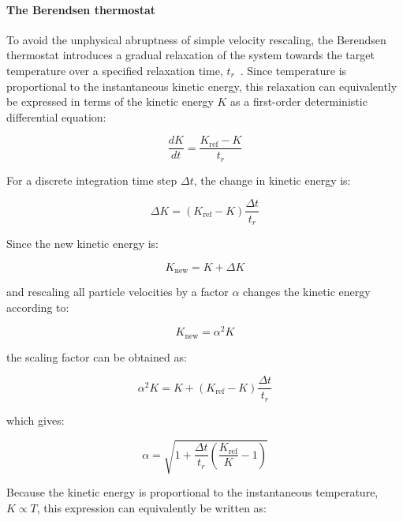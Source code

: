 \paragraph{The Berendsen thermostat}

To avoid the unphysical abruptness of simple velocity rescaling, the
Berendsen thermostat introduces a gradual relaxation of the system towards
the target temperature over a specified relaxation time, $t_r$~\cite{BerendsenB}.
Since temperature is proportional to the instantaneous kinetic energy, this
relaxation can equivalently be expressed in terms of the kinetic energy $K$
as a first-order deterministic differential equation:

\begin{equation}\label{eq:berendsen_dk}
    \frac{dK}{dt}
    =
    \frac{K_{\mathrm{ref}}-K}{t_r}
\end{equation}

For a discrete integration time step $\Delta t$, the change in kinetic
energy is:

\begin{equation}
    \Delta K
    =
    (K_{\mathrm{ref}}-K)
    \frac{\Delta t}{t_r}
\end{equation}

Since the new kinetic energy is:

\begin{equation}
    K_{\mathrm{new}} = K + \Delta K
\end{equation}

and rescaling all particle velocities by a factor $\alpha$ changes the
kinetic energy according to:

\begin{equation}
    K_{\mathrm{new}} = \alpha^2 K
\end{equation}

the scaling factor can be obtained as:

\begin{equation}
    \alpha^2 K
    =
    K+
    (K_{\mathrm{ref}}-K)\frac{\Delta t}{t_r}
\end{equation}

which gives:

\begin{equation}
    \alpha
    =
    \sqrt{
        1+
        \frac{\Delta t}{t_r}
        \left(
            \frac{K_{\mathrm{ref}}}{K}-1
        \right)
    }
\end{equation}

Because the kinetic energy is proportional to the instantaneous temperature,
$K \propto T$, this expression can equivalently be written as:

